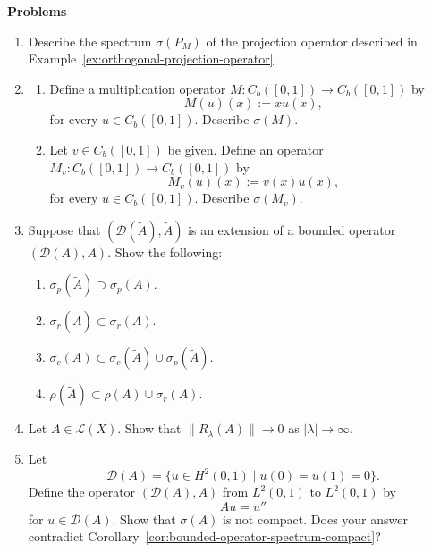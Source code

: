 \textbf{Problems}

\begin{enumerate}[label=\thesection.\arabic*.,ref=\thesection.\arabic*,start=17,series=book-problems]

\item\label{ex:orthogonal-projection-spectrum} Describe the spectrum $\sigma(P_M)$ of the projection operator described in Example~\ref{ex:orthogonal-projection-operator}.

\item\label{ex:continuous-multiplication-operator-spectrum} \begin{enumerate}[label=(\alph*)]\item Define a multiplication operator $M:C_b([0,1])\to C_b([0,1])$ by\[M(u)(x):=xu(x),\]for every $u\in C_b([0,1])$. Describe $\sigma(M)$.\item Let $v\in C_b([0,1])$ be given. Define an operator $M_v:C_b([0,1])\to C_b([0,1])$ by\[M_v(u)(x):=v(x)u(x),\]for every $u\in C_b([0,1])$. Describe $\sigma(M_v)$.\end{enumerate}

\item\label{ex:bounded-operator-extension-spectral-inclusions} Suppose that $(\mathcal{D}(\widetilde A),\widetilde A)$ is an extension of a bounded operator $(\mathcal{D}(A),A)$. Show the following:\begin{enumerate}[label=(\alph*)]
\item $\sigma_p(\widetilde A)\supset\sigma_p(A)$.
\item $\sigma_r(\widetilde A)\subset\sigma_r(A)$.
\item $\sigma_c(A)\subset\sigma_c(\widetilde A)\cup\sigma_p(\widetilde A)$.
\item $\rho(\widetilde A)\subset\rho(A)\cup\sigma_r(A)$.
\end{enumerate}

\item\label{ex:bounded-operator-resolvent-decay-at-infinity} Let $A\in\mathcal{L}(X)$. Show that $\|R_\lambda(A)\|\to0$ as $|\lambda|\to\infty$.

\item\label{ex:unbounded-second-derivative-noncompact-spectrum} Let\[\mathcal{D}(A)=\{u\in H^2(0,1)\mid u(0)=u(1)=0\}.\]Define the operator $(\mathcal{D}(A),A)$ from $L^2(0,1)$ to $L^2(0,1)$ by\[Au=u''\]for $u\in\mathcal{D}(A)$. Show that $\sigma(A)$ is not compact. Does your answer contradict Corollary~\ref{cor:bounded-operator-spectrum-compact}?


\end{enumerate}

